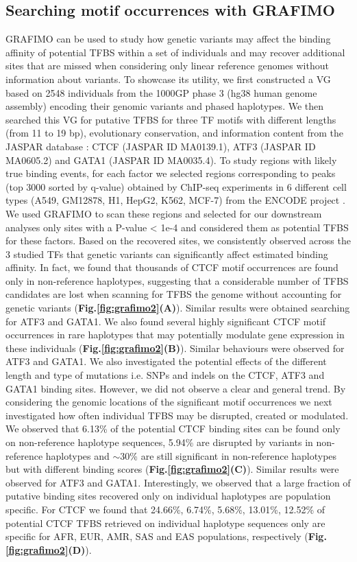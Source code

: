 \documentclass[a4paper, titlepage, openright]{book}
\newcommand{\grafimo}{GRAFIMO\xspace}
\begin{document}
\subsection{Searching motif occurrences with \grafimo}
\grafimo can be used to study how genetic variants may affect the binding affinity of potential TFBS within a set of individuals and may recover additional sites that are missed when considering only linear reference genomes without information about variants. To showcase its utility, we first constructed a VG based on 2548 individuals from the 1000GP phase 3 (hg38 human genome assembly) encoding their genomic variants and phased haplotypes. We then searched this VG for putative TFBS for three TF motifs with different lengths (from 11 to 19 bp), evolutionary conservation, and information content from the JASPAR database \citep{fornes2020jaspar}: CTCF (JASPAR ID MA0139.1), ATF3 (JASPAR ID MA0605.2) and GATA1 (JASPAR ID MA0035.4).  To study regions with likely true binding events, for each factor we selected regions corresponding to peaks (top 3000 sorted by q-value) obtained by ChIP-seq experiments in 6 different cell types (A549, GM12878, H1, HepG2, K562, MCF-7) from the ENCODE project \citep{encode2012integrated}. We used \grafimo to scan these regions and selected for our downstream analyses only sites with a P-value < 1e-4 and considered them as potential TFBS for these factors. Based on the recovered sites, we consistently observed across the 3 studied TFs that genetic variants can significantly affect estimated binding affinity. In fact, we found that thousands of CTCF motif occurrences are found only in non-reference haplotypes, suggesting that a considerable number of TFBS candidates are lost when scanning for TFBS the genome without accounting for genetic variants (\textbf{Fig.\ref{fig:grafimo2}(A)}). Similar results were obtained searching for ATF3 and GATA1. We also found several highly significant CTCF motif occurrences in rare haplotypes that may potentially modulate gene expression in these individuals (\textbf{Fig.\ref{fig:grafimo2}(B)}). Similar behaviours were observed for ATF3 and GATA1. We also investigated the potential effects of the different length and type of mutations i.e. SNPs and indels on the CTCF, ATF3 and GATA1 binding sites. However, we did not observe a clear and general trend. By considering the genomic locations of the significant motif occurrences we next investigated how often individual TFBS may be disrupted, created or modulated. We observed that 6.13\% of the potential CTCF binding sites can be found only on non-reference haplotype sequences, 5.94\% are disrupted by variants in non-reference haplotypes and $\sim$30\% are still significant in non-reference haplotypes but with different binding scores (\textbf{Fig.\ref{fig:grafimo2}(C)}). Similar results were observed for ATF3 and GATA1. Interestingly, we observed that a large fraction of putative binding sites recovered only on individual haplotypes are population specific. For CTCF we found that 24.66\%, 6.74\%, 5.68\%, 13.01\%, 12.52\% of potential CTCF TFBS retrieved on individual haplotype sequences only are specific for AFR, EUR, AMR, SAS and EAS populations, respectively (\textbf{Fig.\ref{fig:grafimo2}(D)}).
\end{document}
